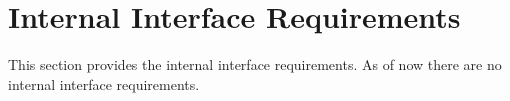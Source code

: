\KNEADSECTIONNEWPAGE
\section{Internal Interface Requirements}
\label{lab:sec_InternalInterfaceRequirements}
% 


This section provides the internal interface requirements. As of now there are no internal interface requirements.


